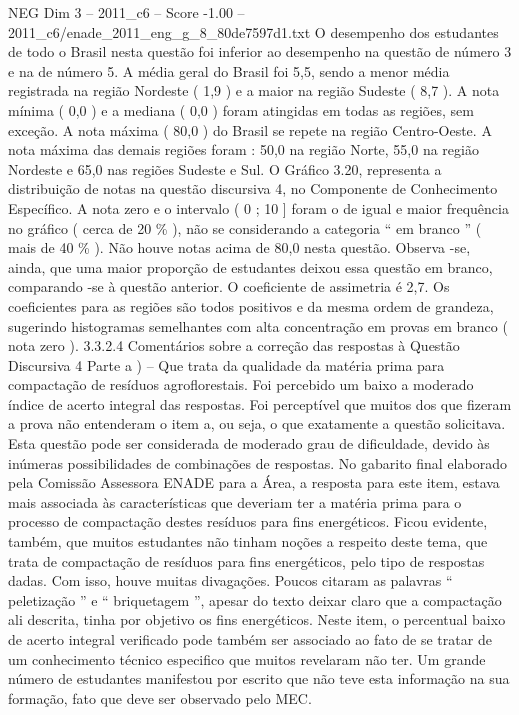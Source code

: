 \begin{textsample}{NEG Dim 3 – 2011\_c6 – Score -1.00 – 2011\_c6/enade\_2011\_eng\_g\_8\_80de7597d1.txt}
O desempenho dos estudantes de todo o Brasil nesta questão foi inferior ao desempenho na questão de número 3 e na de número 5.
A média geral do Brasil foi 5,5, sendo a menor média registrada na região Nordeste ( 1,9 ) e a maior na região Sudeste ( 8,7 ).
A nota mínima ( 0,0 ) e a mediana ( 0,0 ) foram atingidas em todas as regiões, sem exceção.
A nota máxima ( 80,0 ) do Brasil se repete na região Centro-Oeste.
A nota máxima das demais regiões foram : 50,0 na região Norte, 55,0 na região Nordeste e 65,0 nas regiões Sudeste e Sul.
O Gráfico 3.20, representa a distribuição de notas na questão discursiva 4, no Componente de Conhecimento Específico.
A nota zero e o intervalo ( 0 ; 10 ] foram o de igual e maior frequência no gráfico ( cerca de 20 \% ), não se considerando a categoria “ em branco ” ( mais de 40 \% ).
Não houve notas acima de 80,0 nesta questão.
Observa -se, ainda, que uma maior proporção de estudantes deixou essa questão em branco, comparando -se à questão anterior.
O coeficiente de assimetria é 2,7.
Os coeficientes para as regiões são todos positivos e da mesma ordem de grandeza, sugerindo histogramas semelhantes com alta concentração em provas em branco ( nota zero ). 3.3.2.4 Comentários sobre a correção das respostas à Questão Discursiva 4 Parte a ) – Que trata da qualidade da matéria prima para compactação de resíduos agroflorestais.
Foi percebido um baixo a moderado índice de acerto integral das respostas.
Foi perceptível que muitos dos que fizeram a prova não entenderam o item a, ou seja, o que exatamente a questão solicitava.
Esta questão pode ser considerada de moderado grau de dificuldade, devido às inúmeras possibilidades de combinações de respostas.
No gabarito final elaborado pela Comissão Assessora ENADE para a Área, a resposta para este item, estava mais associada às características que deveriam ter a matéria prima para o processo de compactação destes resíduos para fins energéticos.
Ficou evidente, também, que muitos estudantes não tinham noções a respeito deste tema, que trata de compactação de resíduos para fins energéticos, pelo tipo de respostas dadas.
Com isso, houve muitas divagações.
Poucos citaram as palavras “ peletização ” e “ briquetagem ”, apesar do texto deixar claro que a compactação ali descrita, tinha por objetivo os fins energéticos.
Neste item, o percentual baixo de acerto integral verificado pode também ser associado ao fato de se tratar de um conhecimento técnico especifico que muitos revelaram não ter.
Um grande número de estudantes manifestou por escrito que não teve esta informação na sua formação, fato que deve ser observado pelo MEC.

\end{textsample}
